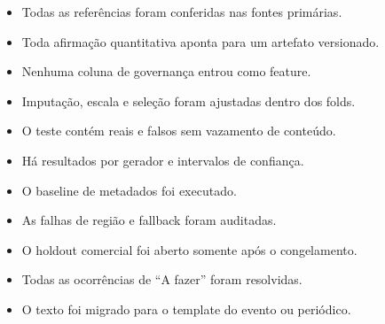\documentclass[11pt,a4paper]{article}
\begin{document}
\begin{itemize}
  \item[$\square$] Todas as referências foram conferidas nas fontes primárias.
  \item[$\square$] Toda afirmação quantitativa aponta para um artefato versionado.
  \item[$\square$] Nenhuma coluna de governança entrou como feature.
  \item[$\square$] Imputação, escala e seleção foram ajustadas dentro dos folds.
  \item[$\square$] O teste contém reais e falsos sem vazamento de conteúdo.
  \item[$\square$] Há resultados por gerador e intervalos de confiança.
  \item[$\square$] O baseline de metadados foi executado.
  \item[$\square$] As falhas de região e fallback foram auditadas.
  \item[$\square$] O holdout comercial foi aberto somente após o congelamento.
  \item[$\square$] Todas as ocorrências de ``A fazer'' foram resolvidas.
  \item[$\square$] O texto foi migrado para o template do evento ou periódico.
\end{itemize}
\end{document}
